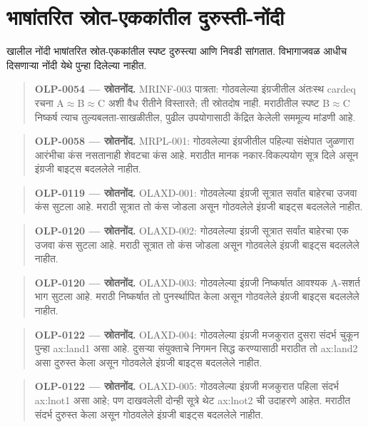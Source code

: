 \section*{भाषांतरित स्रोत-एककांतील दुरुस्ती-नोंदी}
खालील नोंदी भाषांतरित स्रोत-एककांतील स्पष्ट दुरुस्त्या आणि निवडी सांगतात. विभागाजवळ आधीच दिसणाऱ्या नोंदी येथे पुन्हा दिलेल्या नाहीत.
\begin{quote}\small\textbf{OLP-0054 — स्रोतनोंद.} MRINF-003 पात्रता: गोठवलेल्या इंग्रजीतील अंतःस्थ cardeq रचना A\ensuremath{\approx}B\ensuremath{\approx}C अशी वैध रीतीने विस्तारते; ती स्रोतदोष नाही. मराठीतील स्पष्ट B\ensuremath{\approx}C निष्कर्ष त्याच तुल्यबलता-साखळीतील, पुढील उपयोगासाठी केंद्रित केलेली सममूल्य मांडणी आहे.\end{quote}
\begin{quote}\small\textbf{OLP-0058 — स्रोतनोंद.} MRPL-001: गोठवलेल्या इंग्रजीतील पहिल्या संक्षेपात जुळणारा आरंभीचा कंस नसतानाही शेवटचा कंस आहे. मराठीत मानक नकार-विकल्पयोग सूत्र दिले असून इंग्रजी बाइट्स बदललेले नाहीत.\end{quote}
\begin{quote}\small\textbf{OLP-0119 — स्रोतनोंद.} OLAXD-001: गोठवलेल्या इंग्रजी सूत्रात सर्वांत बाहेरचा उजवा कंस सुटला आहे. मराठी सूत्रात तो कंस जोडला असून गोठवलेले इंग्रजी बाइट्स बदललेले नाहीत.\end{quote}
\begin{quote}\small\textbf{OLP-0120 — स्रोतनोंद.} OLAXD-002: गोठवलेल्या इंग्रजी सूत्रात सर्वांत बाहेरचा एक उजवा कंस सुटला आहे. मराठी सूत्रात तो कंस जोडला असून गोठवलेले इंग्रजी बाइट्स बदललेले नाहीत.\end{quote}
\begin{quote}\small\textbf{OLP-0120 — स्रोतनोंद.} OLAXD-003: गोठवलेल्या इंग्रजी निष्कर्षात आवश्यक A-सशर्त भाग सुटला आहे. मराठी निष्कर्षात तो पुनर्स्थापित केला असून गोठवलेले इंग्रजी बाइट्स बदललेले नाहीत.\end{quote}
\begin{quote}\small\textbf{OLP-0122 — स्रोतनोंद.} OLAXD-004: गोठवलेल्या इंग्रजी मजकुरात दुसरा संदर्भ चुकून पुन्हा ax:land1 असा आहे. दुसऱ्या संयुक्ताचे निगमन सिद्ध करण्यासाठी मराठीत तो ax:land2 असा दुरुस्त केला असून गोठवलेले इंग्रजी बाइट्स बदललेले नाहीत.\end{quote}
\begin{quote}\small\textbf{OLP-0122 — स्रोतनोंद.} OLAXD-005: गोठवलेल्या इंग्रजी मजकुरात पहिला संदर्भ ax:lnot1 असा आहे; पण दाखवलेली दोन्ही सूत्रे थेट ax:lnot2 ची उदाहरणे आहेत. मराठीत संदर्भ दुरुस्त केला असून गोठवलेले इंग्रजी बाइट्स बदललेले नाहीत.\end{quote}
